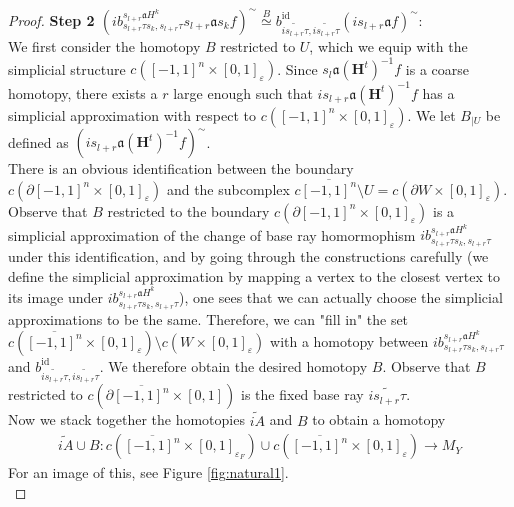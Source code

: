 \documentclass[a4paper,11pt]{article}
\theoremstyle{definition}
\theoremstyle{plain}
\theoremstyle{remark}
\DeclareMathOperator{\id}{id}
\begin{document}
{\begin{proof}
\textbf{Step 2 $ (i b^{s_{l+r}\mathfrak{a}H^{k}}_{s_{l+r}\tau s_{k},s_{l+r}\tau} s_{l+r}\mathfrak{a} s_{k} f)^{\sim} \overset{B}{\simeq} b^{\id}_{\widetilde{is_{l+r}\tau},\widetilde{is_{l+r}\tau}}(i s_{l+r}\mathfrak{a}f)^{\sim}$}: \\

We first consider the homotopy $B$ restricted to $U$, which we equip with the simplicial structure $c([-1,1]^n \times [0,1]_{\varepsilon})$. Since $s_{l}\mathfrak{a} (\mathbf{H}^{t})^{-1}f$ is a coarse homotopy, there exists a $r$ large enough such that $is_{l+r}\mathfrak{a} (\mathbf{H}^{t})^{-1}f$ has a simplicial approximation with respect to $c([-1,1]^n \times [0,1]_{\varepsilon})$. We let $B_{|U}$ be defined as $(is_{l+r} \mathfrak{a} (\mathbf{H}^{t})^{-1}f)^{\sim}$.\\

There is an obvious identification between the boundary $c(\partial[-1,1]^n \times [0,1]_{\varepsilon})$ and the subcomplex $c\overline{[-1,1]^n}\setminus U = c(\partial W \times [0,1]_{\varepsilon})$. Observe that $B$ restricted to the boundary $c(\partial [-1,1]^n \times [0,1]_{\varepsilon})$ is a simplicial approximation of the change of base ray homormophism $i b^{s_{l+r}\mathfrak{a}H^{k}}_{s_{l+r}\tau s_{k},s_{l+r}\tau}$ under this identification, and by going through the constructions carefully (we define the simplicial approximation by mapping a vertex to the closest vertex to its image under $i b^{s_{l+r}\mathfrak{a}H^{k}}_{s_{l+r}\tau s_{k},s_{l+r}\tau}$), one sees that we can actually choose the simplicial approximations to be the same. Therefore, we can "fill in" the set $c(\overline{[-1,1]^n} \times [0,1]_{\varepsilon})\setminus c(W\times [0,1]_{\varepsilon})$ with a homotopy between $i b^{s_{l+r}\mathfrak{a}H^{k}}_{s_{l+r}\tau s_{k},s_{l+r}\tau}$ and $b^{\id}_{\widetilde{is_{l+r} \tau}, \widetilde{is_{l+r}\tau}}$. We therefore obtain the desired homotopy $B$. Observe that $B$ restricted to $c(\partial \overline{[-1,1]^n} \times [0,1])$ is the fixed base ray $\widetilde{is_{l+r} \tau}$. \\

Now we stack together the homotopies $\widetilde{iA}$ and $B$ to obtain a homotopy 
\begin{align*}
\widetilde{iA} \cup B: c(\overline{[-1,1]^n} \times [0,1]_{\varepsilon_F}) \cup c(\overline{[-1,1]^n} \times [0,1]_{\varepsilon})\rightarrow M_{Y}
\end{align*}
For an image of this, see Figure \ref{fig:natural1}.\\


\end{proof}}
\end{document}
